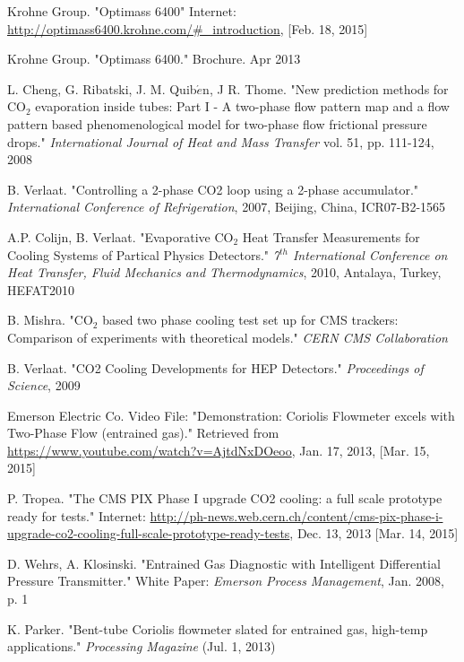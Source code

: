 \documentclass{report}
\begin{document}
\begin{itemize}
\begin{thebibliography}{9}
Krohne Group. "Optimass 6400" Internet: \underline{http://optimass6400.krohne.com/\#\_introduction}, [Feb. 18, 2015]

Krohne Group. "Optimass 6400." Brochure. Apr 2013

L. Cheng, G. Ribatski, J. M. Quib$\acute{e}$n, J R. Thome. "New prediction methods for CO$_2$ evaporation inside tubes: Part I - A two-phase flow pattern map and a flow pattern based phenomenological model for two-phase flow frictional pressure drops." \textit{International Journal of Heat and Mass Transfer} vol. 51, pp. 111-124, 2008

B. Verlaat. "Controlling a 2-phase CO2 loop using a 2-phase accumulator." \textit{International Conference of Refrigeration}, 2007, Beijing, China, ICR07-B2-1565 

A.P. Colijn, B. Verlaat. "Evaporative CO$_2$ Heat Transfer Measurements for Cooling Systems of Partical Physics Detectors." \textit{7$^{
th}$ International Conference on Heat Transfer, Fluid Mechanics and Thermodynamics}, 2010, Antalaya, Turkey, HEFAT2010 

B. Mishra. "CO$_2$ based two phase cooling test set up for CMS trackers: Comparison of experiments with theoretical models." \textit{CERN CMS Collaboration}

B. Verlaat. "CO2 Cooling Developments for HEP Detectors." \textit{Proceedings of Science}, 2009

Emerson Electric Co. Video File: "Demonstration: Coriolis Flowmeter excels with Two-Phase Flow (entrained gas)." Retrieved from \underline{https://www.youtube.com/watch?v=AjtdNxDOeoo}, Jan. 17, 2013, [Mar. 15, 2015]

P. Tropea. "The CMS PIX Phase I upgrade CO2 cooling: a full scale prototype ready for tests." Internet: \underline{http://ph-news.web.cern.ch/content/cms-pix-phase-i-upgrade-co2-cooling-full-scale-prototype-ready-tests}, Dec. 13, 2013 [Mar. 14, 2015] 

D. Wehrs, A. Klosinski. "Entrained Gas Diagnostic with Intelligent Differential Pressure Transmitter." White Paper: \textit{Emerson Process Management}, Jan. 2008, p. 1

K. Parker. "Bent-tube Coriolis flowmeter slated for entrained gas, high-temp applications." \textit{Processing Magazine} (Jul. 1, 2013)


\end{thebibliography}
\end{itemize}
\end{document}
